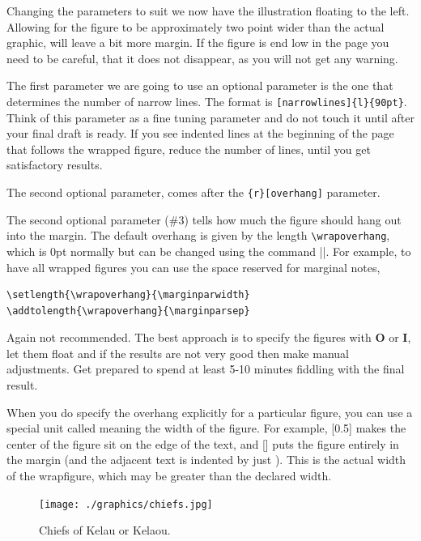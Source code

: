 Changing the parameters to suit we now have the illustration floating to the left. Allowing for the figure to be approximately two point  wider than the actual graphic, will leave a bit more margin. If the figure is end low in the page you need to be careful, that it does not disappear, as you will not get any warning.

The first parameter we are going to use an optional parameter is the one that determines the number of narrow lines. The format is \verb+[narrowlines]{l}{90pt}+. Think of this parameter as a fine tuning parameter and do not touch it until after your final draft is ready. If you see indented lines at the beginning of the page that follows the wrapped figure, reduce the number of lines, until you get satisfactory results.

The second optional parameter, comes after the \texttt{\{r\}[overhang]} parameter.

The second optional parameter (\#3) tells how much the figure should hang out into
the margin. The default overhang is given by the length \verb+\wrapoverhang+, which is 0pt
normally but can be changed using the command |\setlength|. For example, to have all wrapped figures you can 
use the space reserved for marginal notes,

\begin{verbatim}
\setlength{\wrapoverhang}{\marginparwidth}
\addtolength{\wrapoverhang}{\marginparsep}
\end{verbatim}

Again not recommended. The best approach is to specify the figures with \textbf{O} or \textbf{I}, let them float and if the results are
not very good then make manual adjustments. Get prepared to spend at least 5-10 minutes fiddling with the final result.

When you do specify the overhang explicitly for a particular figure, you can use a
special unit called \string\width meaning the width of the figure. For example, [0.5\string\width]
makes the center of the ﬁgure sit on the edge of the text, and [\string\width] puts the ﬁgure
entirely in the margin (and the adjacent text is indented by just \string\columnsep). This
\texttt{\string\width} is the actual width of the wrapfigure, which may be greater than the declared
width.

\begin{figure}[tb]
\texttt{[image: ./graphics/chiefs.jpg]}
\caption{Chiefs of Kelau or Kelaou.}
\label{fig:chiefs}
\end{figure}

